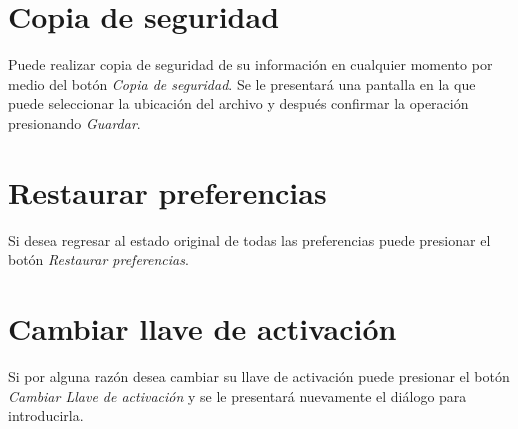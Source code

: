 \section{Copia de seguridad}
\label{sec:copiaDeSeguridad}
Puede realizar copia de seguridad de su informaci\'on en cualquier momento por
medio del bot\'on \emph{Copia de seguridad}. Se le presentar\'a una pantalla en
la que puede seleccionar la ubicaci\'on del archivo y despu\'es confirmar la
operaci\'on presionando \emph{Guardar}.
\section{Restaurar preferencias}
Si desea regresar al estado original de todas las preferencias puede presionar
el bot\'on \emph{Restaurar preferencias}.
\section{Cambiar llave de activaci\'on}
Si por alguna raz\'on desea cambiar su llave de activaci\'on puede presionar el
bot\'on \emph{Cambiar Llave de activaci\'on} y se le presentar\'a nuevamente el
di\'alogo para introducirla.